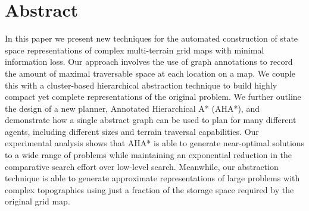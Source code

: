 \section{Abstract}
In this paper we present new techniques for the automated construction of state space representations of complex multi-terrain grid maps with minimal information loss. Our approach involves the use of graph annotations to record the amount of maximal traversable space at each location on a map. We couple this with a cluster-based hierarchical abstraction technique to build highly compact yet complete representations of the original problem. We further outline the design of a new planner, Annotated Hierarchical A* (AHA*), and demonstrate how a single abstract graph can be used to plan for many different agents, including different sizes and terrain traversal capabilities. 
Our experimental analysis shows that AHA* is able to generate near-optimal solutions to a wide range of problems while maintaining an exponential reduction in the comparative search effort over low-level search. Meanwhile, our abstraction technique is able to generate approximate representations of large problems with complex topographies using just a fraction of the storage space required by the original grid map.

